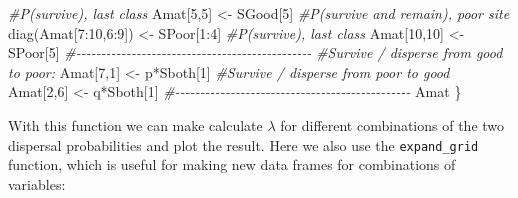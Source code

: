 \documentclass[
]{book}
\newenvironment{Shaded}{\begin{snugshade}}{\end{snugshade}}
\newcommand{\CommentTok}[1]{\textcolor[rgb]{0.56,0.35,0.01}{\textit{#1}}}
\newcommand{\DecValTok}[1]{\textcolor[rgb]{0.00,0.00,0.81}{#1}}
\newcommand{\FunctionTok}[1]{\textcolor[rgb]{0.00,0.00,0.00}{#1}}
\newcommand{\NormalTok}[1]{#1}
\newcommand{\OtherTok}[1]{\textcolor[rgb]{0.56,0.35,0.01}{#1}}
\newcommand{\SpecialCharTok}[1]{\textcolor[rgb]{0.00,0.00,0.00}{#1}}
\begin{document}
\begin{Shaded}
\begin{Highlighting}[]
  \CommentTok{\#P(survive), last class}
\NormalTok{  Amat[}\DecValTok{5}\NormalTok{,}\DecValTok{5}\NormalTok{] }\OtherTok{\textless{}{-}}\NormalTok{ SGood[}\DecValTok{5}\NormalTok{]  }
  \CommentTok{\#P(survive and remain), poor site}
  \FunctionTok{diag}\NormalTok{(Amat[}\DecValTok{7}\SpecialCharTok{:}\DecValTok{10}\NormalTok{,}\DecValTok{6}\SpecialCharTok{:}\DecValTok{9}\NormalTok{]) }\OtherTok{\textless{}{-}}\NormalTok{ SPoor[}\DecValTok{1}\SpecialCharTok{:}\DecValTok{4}\NormalTok{]  }
  \CommentTok{\#P(survive), last class}
\NormalTok{  Amat[}\DecValTok{10}\NormalTok{,}\DecValTok{10}\NormalTok{] }\OtherTok{\textless{}{-}}\NormalTok{ SPoor[}\DecValTok{5}\NormalTok{]  }
  \CommentTok{\#{-}{-}{-}{-}{-}{-}{-}{-}{-}{-}{-}{-}{-}{-}{-}{-}{-}{-}{-}{-}{-}{-}{-}{-}{-}{-}{-}{-}{-}{-}{-}{-}{-}{-}{-}{-}{-}{-}{-}{-}{-}{-}{-}{-}{-}{-}{-}}
  \CommentTok{\#Survive / disperse from good to poor:}
\NormalTok{  Amat[}\DecValTok{7}\NormalTok{,}\DecValTok{1}\NormalTok{] }\OtherTok{\textless{}{-}}\NormalTok{ p}\SpecialCharTok{*}\NormalTok{Sboth[}\DecValTok{1}\NormalTok{] }
  \CommentTok{\#Survive / disperse from poor to good}
\NormalTok{  Amat[}\DecValTok{2}\NormalTok{,}\DecValTok{6}\NormalTok{] }\OtherTok{\textless{}{-}}\NormalTok{ q}\SpecialCharTok{*}\NormalTok{Sboth[}\DecValTok{1}\NormalTok{] }
  \CommentTok{\#{-}{-}{-}{-}{-}{-}{-}{-}{-}{-}{-}{-}{-}{-}{-}{-}{-}{-}{-}{-}{-}{-}{-}{-}{-}{-}{-}{-}{-}{-}{-}{-}{-}{-}{-}{-}{-}{-}{-}{-}{-}{-}{-}{-}{-}{-}{-}}
\NormalTok{  Amat}
\NormalTok{\}}
\end{Highlighting}
\end{Shaded}

With this function we can make calculate \(\lambda\) for different combinations of the two dispersal probabilities and plot the result. Here we also use the \texttt{expand\_grid} function, which is useful for making new data frames for combinations of variables:
\end{document}
